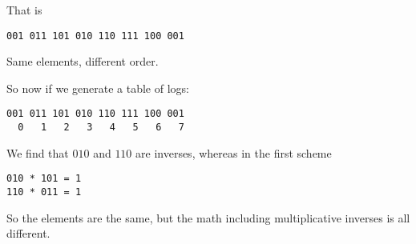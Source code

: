 \documentclass[11pt, oneside]{article}
\begin{document}
That is
\begin{verbatim}
001 011 101 010 110 111 100 001
\end{verbatim}

Same elements, different order.
 
So now if we generate a table of logs:
\begin{verbatim}
001 011 101 010 110 111 100 001
  0   1   2   3   4   5   6   7
\end{verbatim}

We find that $010$ and $110$ are inverses, whereas in the first scheme 

\begin{verbatim}
010 * 101 = 1
110 * 011 = 1
\end{verbatim}

So the elements are the same, but the math including multiplicative inverses is all different.
\end{document}
